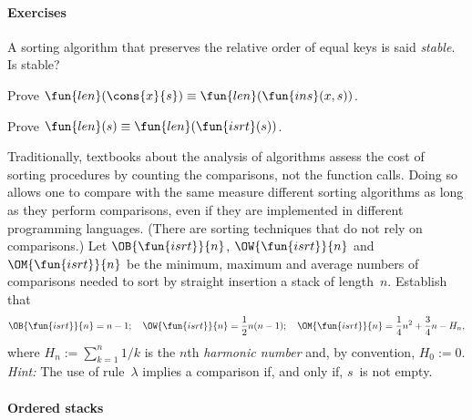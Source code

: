 \paragraph{Exercises}
\begin{enumerate*}

  \item A sorting algorithm that preserves the relative order of equal
    keys is said \emph{stable}. Is
     stable?

  \item Prove \(\fun{len}(\cons{x}{s}) \equiv
    \fun{len}(\fun{ins}(x,s))\).

  \item Prove \(\fun{len}(s) \equiv \fun{len}(\fun{isrt}(s))\).

  \item Traditionally, textbooks about the analysis of algorithms
    assess the cost of sorting procedures by counting the comparisons,
    not the function calls. Doing so allows one to compare with the
    same measure different sorting algorithms as long as they perform
    comparisons, even if they are implemented in different programming
    languages. (There are sorting techniques that do not rely on
    comparisons.) Let
    \(\OB{\fun{isrt}}{n}\),
    \(\OW{\fun{isrt}}{n}\) and
    \(\OM{\fun{isrt}}{n}\) be the
    minimum, maximum and average numbers of comparisons needed to sort
    by straight insertion a stack of length~\(n\). Establish that
    \begin{equation*}
      \OB{\fun{isrt}}{n} = n - 1; \quad
      \OW{\fun{isrt}}{n} = \frac{1}{2}n(n - 1); \quad
      \OM{\fun{isrt}}{n} = \frac{1}{4}n^2 + \frac{3}{4}n - H_n,
    \end{equation*}
    where \(H_n := \sum_{k=1}^n{1/k}\) is the \(n\)th \emph{harmonic
      number} and, by convention, \(H_0 :=
    0\). \emph{Hint:} The use of rule~\(\lambda\) implies a comparison
    if, and only if, \(s\)~is not empty.

\end{enumerate*}

\paragraph{Ordered stacks}

